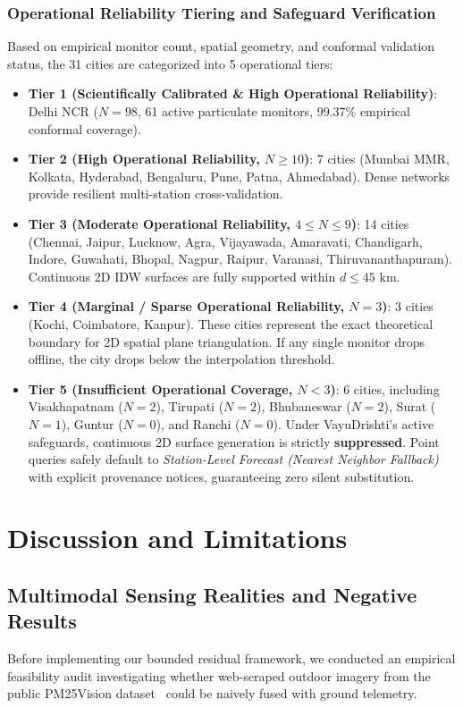 \documentclass[conference]{IEEEtran}
\begin{document}
\subsubsection{Operational Reliability Tiering and Safeguard Verification}
Based on empirical monitor count, spatial geometry, and conformal validation status, the 31 cities are categorized into 5 operational tiers:
\begin{itemize}
    \item \textbf{Tier 1 (Scientifically Calibrated & High Operational Reliability)}: Delhi NCR ($N=98$, 61 active particulate monitors, 99.37\% empirical conformal coverage).
    \item \textbf{Tier 2 (High Operational Reliability, $N \ge 10$)}: 7 cities (Mumbai MMR, Kolkata, Hyderabad, Bengaluru, Pune, Patna, Ahmedabad). Dense networks provide resilient multi-station cross-validation.
    \item \textbf{Tier 3 (Moderate Operational Reliability, $4 \le N \le 9$)}: 14 cities (Chennai, Jaipur, Lucknow, Agra, Vijayawada, Amaravati, Chandigarh, Indore, Guwahati, Bhopal, Nagpur, Raipur, Varanasi, Thiruvananthapuram). Continuous 2D IDW surfaces are fully supported within $d \le 45\text{ km}$.
    \item \textbf{Tier 4 (Marginal / Sparse Operational Reliability, $N = 3$)}: 3 cities (Kochi, Coimbatore, Kanpur). These cities represent the exact theoretical boundary for 2D spatial plane triangulation. If any single monitor drops offline, the city drops below the interpolation threshold.
    \item \textbf{Tier 5 (Insufficient Operational Coverage, $N < 3$)}: 6 cities, including Visakhapatnam ($N=2$), Tirupati ($N=2$), Bhubaneswar ($N=2$), Surat ($N=1$), Guntur ($N=0$), and Ranchi ($N=0$). Under VayuDrishti's active safeguards, continuous 2D surface generation is strictly \textbf{suppressed}. Point queries safely default to \textit{Station-Level Forecast (Nearest Neighbor Fallback)} with explicit provenance notices, guaranteeing zero silent substitution.
\end{itemize}

\section{Discussion and Limitations}
\label{sec:discussion}

\subsection{Multimodal Sensing Realities and Negative Results}
Before implementing our bounded residual framework, we conducted an empirical feasibility audit investigating whether web-scraped outdoor imagery from the public PM25Vision dataset~\cite{pm25vision2023} could be naively fused with ground telemetry.
\end{document}
